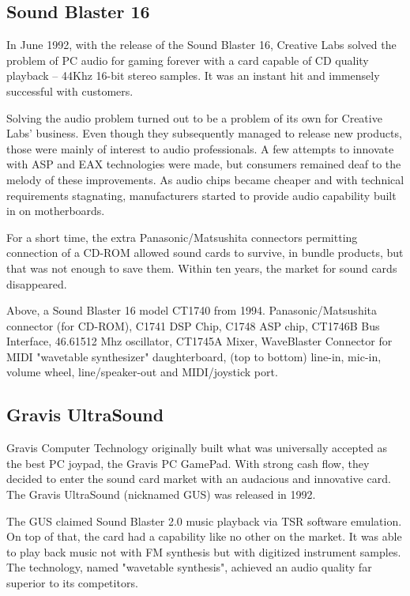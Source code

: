\subsection{Sound Blaster 16}
 In June 1992, with the release of the Sound Blaster 16, Creative Labs solved the problem of PC audio for gaming forever with a card capable of CD quality playback -- 44Khz 16-bit stereo samples. It was an instant hit and immensely successful with customers.\\
\par
{}
\par
Solving the audio problem turned out to be a problem of its own for Creative Labs' business. Even though they subsequently managed to release new products, those were mainly of interest to audio professionals. A few attempts to innovate with ASP and EAX technologies were made, but consumers remained deaf to the melody of these improvements. As audio chips became cheaper and with technical requirements stagnating, manufacturers started to provide audio capability built in on motherboards.\\
\par
For a short time, the extra Panasonic/Matsushita connectors permitting connection of a CD-ROM allowed sound cards to survive, in bundle products, but that was not enough to save them. Within ten years, the market for sound cards disappeared.\\
\par
{}
\par
Above, a Sound Blaster 16 model CT1740 from 1994.  Panasonic/Matsushita connector (for CD-ROM),  C1741 DSP Chip,  C1748 ASP chip,  CT1746B Bus Interface,  46.61512 Mhz oscillator,  CT1745A Mixer,  WaveBlaster Connector for MIDI "wavetable synthesizer" daughterboard,  (top to bottom) line-in, mic-in, volume wheel, line/speaker-out and MIDI/joystick port.







\subsection{Gravis UltraSound}
Gravis Computer Technology originally built what was universally accepted as the best PC joypad, the Gravis PC GamePad. With strong cash flow, they decided to enter the sound card market with an audacious and innovative card. The Gravis UltraSound (nicknamed GUS) was released in 1992.\\
\par
The GUS claimed Sound Blaster 2.0 music playback via TSR software emulation. On top of that, the card had a capability like no other on the market. It was able to play back music not with FM synthesis but with digitized instrument samples. The technology, named "wavetable synthesis", achieved an audio quality far superior to its competitors.


